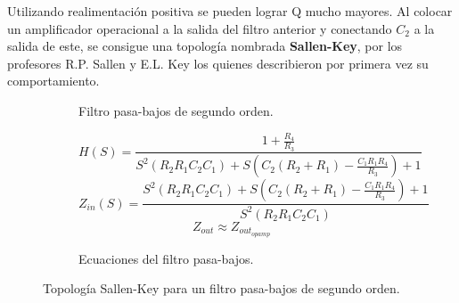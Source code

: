 Utilizando realimentación positiva se pueden lograr Q mucho mayores. Al colocar un amplificador operacional a la salida del filtro anterior y conectando $C_2$ a la salida de este, se consigue una topología nombrada \textbf{Sallen-Key}, por los profesores R.P. Sallen y E.L. Key los quienes describieron por primera vez su comportamiento.

\begin{figure}[H]

	\begin{subfigure}[t]{0.49\textwidth}

		\centering
	\caption{Filtro pasa-bajos de segundo orden.}
	\label{fig:sallenkey}
	\end{subfigure}
	\begin{subfigure}{0.49\textwidth}
		\vspace{-4cm}
		\begin{equation*}
			H(S) = \frac{1+ \frac{R_4}{R_3}}{S^2 (R_2 R_1 C_2 C_1) + S(C_2 (R_2 + R_1) - \frac{C_1 R_1 R_4}{R_3}) + 1} 
		\end{equation*}				
		\begin{equation*}
			Z_{in}(S) = \frac{S^2 (R_2 R_1 C_2 C_1) + S(C_2 (R_2 + R_1) - \frac{C_1 R_1 R_4}{R_3}) + 1}{S^2 (R_2 R_1 C_2 C_1)}
		\end{equation*}
		\begin{equation*}
		Z_{out}\approx Z_{out_{opamp}}
		\end{equation*}
	\caption{Ecuaciones del filtro pasa-bajos.}
	\end{subfigure}
	\caption{Topología Sallen-Key para un filtro pasa-bajos de segundo orden.}
\end{figure}

